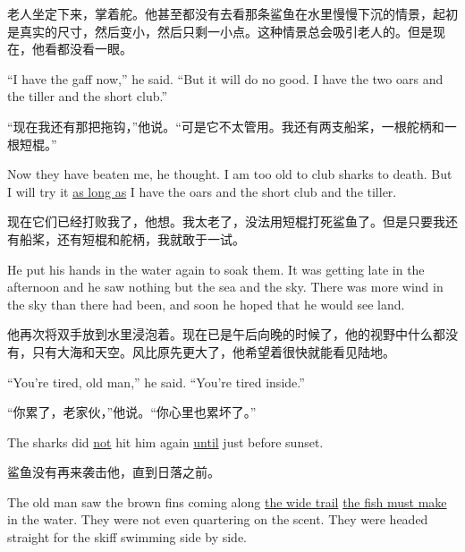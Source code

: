 \begin{paracol}{2}
\switchcolumn

老人坐定下来，掌着舵。他甚至都没有去看那条鲨鱼在水里慢慢下沉的情景，起初是真实的尺寸，然后变小，然后只剩一小点。这种情景总会吸引老人的。但是现在，他看都没看一眼。

\switchcolumn*

``I have the gaff now,'' he said. ``But it will do no good. I have the two
oars and the tiller and the short club.''

\switchcolumn

“现在我还有那把拖钩，”他说。“可是它不太管用。我还有两支船桨，一根舵柄和一根短棍。”

\switchcolumn*

Now they have beaten me, he thought. I am too old to club sharks to death.
But I will try it \uline{as long as} I have the oars and the short club and the
tiller.

\switchcolumn

现在它们已经打败我了，他想。我太老了，没法用短棍打死鲨鱼了。但是只要我还有船桨，还有短棍和舵柄，我就敢于一试。

\switchcolumn*

He put his hands in the water again to soak them. It was getting late in the
afternoon and he saw nothing but the sea and the sky. There was more wind in
the sky than there had been, and soon he hoped that he would see land.

\switchcolumn

他再次将双手放到水里浸泡着。现在已是午后向晚的时候了，他的视野中什么都没有，只有大海和天空。风比原先更大了，他希望着很快就能看见陆地。

\switchcolumn*

``You're tired, old man,'' he said. ``You're tired inside.''

\switchcolumn

“你累了，老家伙，”他说。“你心里也累坏了。”

\switchcolumn*

The sharks did \uline{not} hit him again \uline{until} just before sunset.

\switchcolumn

鲨鱼没有再来袭击他，直到日落之前。

\switchcolumn*

The old man saw the brown fins coming along \uline{the wide trail} \uline{the fish
  must make} in the water. They were not even quartering on the scent. They
were headed straight for the skiff swimming side by side.

\switchcolumn


\end{paracol}
